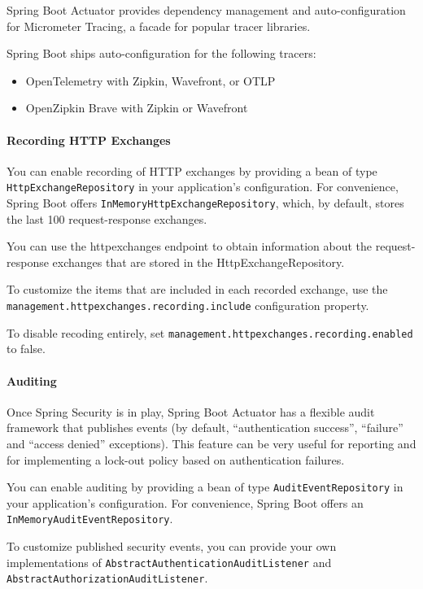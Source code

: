 \documentclass{scrartcl}
\begin{document}
Spring Boot Actuator provides dependency management and auto-configuration for Micrometer Tracing, a facade for popular tracer libraries.

Spring Boot ships auto-configuration for the following tracers:

\begin{itemize}
    \item OpenTelemetry with Zipkin, Wavefront, or OTLP
    \item OpenZipkin Brave with Zipkin or Wavefront
\end{itemize}

\paragraph{Recording HTTP Exchanges}

You can enable recording of HTTP exchanges by providing a bean of type \lstinline|HttpExchangeRepository| in your application’s configuration. For convenience, Spring Boot offers \lstinline|InMemoryHttpExchangeRepository|, which, by default, stores the last 100 request-response exchanges.

You can use the httpexchanges endpoint to obtain information about the request-response exchanges that are stored in the HttpExchangeRepository.

To customize the items that are included in each recorded exchange, use the \lstinline|management.httpexchanges.recording.include| configuration property.

To disable recoding entirely, set \lstinline|management.httpexchanges.recording.enabled| to false.

\paragraph{Auditing}

Once Spring Security is in play, Spring Boot Actuator has a flexible audit framework that publishes events (by default, “authentication success”, “failure” and “access denied” exceptions). This feature can be very useful for reporting and for implementing a lock-out policy based on authentication failures.

You can enable auditing by providing a bean of type \lstinline|AuditEventRepository| in your application’s configuration. For convenience, Spring Boot offers an \lstinline|InMemoryAuditEventRepository|.

To customize published security events, you can provide your own implementations of \lstinline|AbstractAuthenticationAuditListener| and \lstinline|AbstractAuthorizationAuditListener|.
\end{document}

